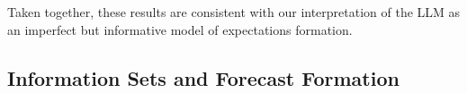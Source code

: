 \documentclass[11pt,letterpaper]{scrartcl}
\begin{document}

Taken together, these results are consistent with our interpretation of the LLM as an imperfect but informative model of expectations formation.



\subsection{Information Sets and Forecast Formation}\label{sec:role_of_inputs}
\end{document}
